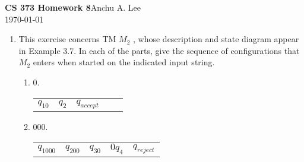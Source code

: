 \documentclass{article}
\begin{document}
    \noindent\textbf{CS 373 Homework 8}\hfill Anchu A. Lee\\
    \noindent\today\\
    \begin{enumerate}
        \item This exercise concerns TM $M_2$ , whose description and state diagram appear in 
        Example 3.7. In each of the parts, give the sequence of configurations that $M_2$ 
        enters when started on the indicated input string.
        \begin{enumerate}[label = (\alph*) ]
            \item 0.\newline
            \begin{tabular}{c c c c c}
                $q_10$\textvisiblespace & \textvisiblespace$q_2$\textvisiblespace 
                & \textvisiblespace\textvisiblespace$q_{accept}$
            \end{tabular}
            \item 000.\newline
            \begin{tabular}{c c c c c}
                $q_1000$\textvisiblespace & \textvisiblespace$q_200$\textvisiblespace 
                & \textvisiblespace\textvisiblespace$q_30$\textvisiblespace 
                & \textvisiblespace\textvisiblespace$0q_4$\textvisiblespace
                & \textvisiblespace\textvisiblespace 0\textvisiblespace$q_{reject}$
            \end{tabular}
                

\end{enumerate}
\end{enumerate}
\end{document}

